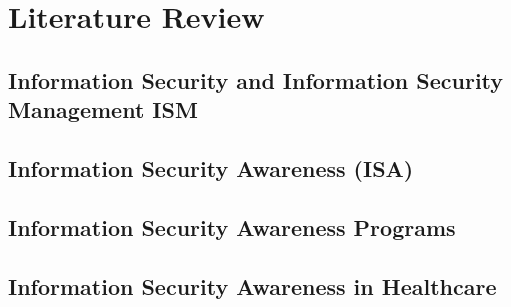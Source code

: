 \chapter{Literature Review}
\label{c:literatur}




\section{Information Security and Information Security Management ISM}
\label{c:literatur:summaries:Information Security}


\section{Information Security Awareness (ISA)}
\label{c:literatur:summaries:info-sec-awa}


%

\section{Information Security Awareness Programs }
\label{c:literatur:summaries:info-sec-awa-prog}


\section{Information Security Awareness in Healthcare}
\label{c:literatur:summaries:info-sec-awa-helth}

%